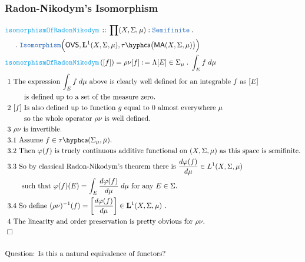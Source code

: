 \documentclass[12pt]{scrartcl}
\newcommand{\TYPE}[1]{\textcolor{NavyBlue}{\mathtt{#1}}}
\newcommand{\FUNC}[1]{\textcolor{Cerulean}{\mathtt{#1}}}
\renewcommand{\.}{\; . \;}
\newcommand{\de}{: \kern 0.1pc =}
\newcommand{\Act}[1]{\left( #1 \right)}
\newcommand{\DeclareFunc}[2]{& \FUNC{#1} \, :: \, #2 \\}
\newcommand{\DefineNamedFunc}[4]{&  \FUNC{#1}\Act{#2} = #3 \de #4 \\}
\newcommand{\NewLine}{\\ & \kern 1pc}
\newcommand{\Page}[1]{ \begin{align*} #1 \end{align*}   }
\newcommand{\QED}{\; \square}
\newcommand{\EndProof}{& \QED \\}
\newcommand{\Explain}[1]{& \text{#1.} \\}
\newcommand{\ExplainFurther}[1]{& \text{#1} \\}
\newcommand{\Semifinite}{\TYPE{Semifinite}}
\newcommand{\ma}{\mathsf{MA}}
\newcommand{\Caf}{\tau\hyph\mathsf{ca}}
\begin{document}
\subsubsection{Radon-Nikodym's Isomorphism}
\Page{
	\DeclareFunc{isomorphismOfRadonNikodym}
	{
		\prod (X,\Sigma,\mu) : \Semifinite \.   \NewLine \.
		\TYPE{Isomorphism}\Big( \mathsf{OVS}, 
		\mathbf{L}^1(X,\Sigma,\mu),  \Caf\big( \ma(X,\Sigma,\mu) \big) \Big)	
	}
	\DefineNamedFunc{isomorphismOfRadonNikodym}{[f]}
	{\rho\nu[f]}{ \Lambda [E] \in \Sigma_\mu \.  \int_E f \; d\mu  }
	\ExplainFurther{ 1 The expression $\int_E f \; d\mu$ above is clearly well defined 
		for an integrable $f$ as $[E]$}
	\Explain{ $\quad\quad$ is defined up to a set of the measure zero}
	\ExplainFurther{ 2 $[f]$ Is also defined up to function $g$ equal to $0$ almost everywhere $\mu$} 
	\Explain{ $\quad\quad$ so the whole operator $\rho\nu$ is well defined}
	\Explain{ 3 $\rho \nu$  is invertible}
	\Explain{ 3.1 Assume $f \in \Caf(\Sigma_\mu,\bar \mu)$}
	\Explain{ 3.2 Then $\varphi(f)$ is truely continuous additive functional on $(X,\Sigma,\mu)$  
		as this space is semifinite}
	\ExplainFurther{ 3.3 So by classical Radon-Nikodym's theorem
		there is $\frac{d \varphi(f)}{d \mu} \in L^1(X,\Sigma,\mu)$}
	\Explain{$\quad \quad$ such that 
	$\varphi(f)(E) = \int_E  \frac{d \varphi(f)}{d \mu} \; d\mu$ for any $E \in \Sigma$}
	\Explain{ 3.4 So define 
	$(\rho \nu)^{-1}(f) = \left[ \frac{d \varphi(f)}{d \mu} \right] \in \mathbf{L}^1(X,\Sigma,\mu)$   }	
	\Explain{ 4 The linearity and order preservation is pretty obvious for 
		$\rho\nu$}
	\EndProof
	\\
	\ExplainFurther{Question: Is this a natural equivalence of functors?}
}
\newpage
\end{document}
